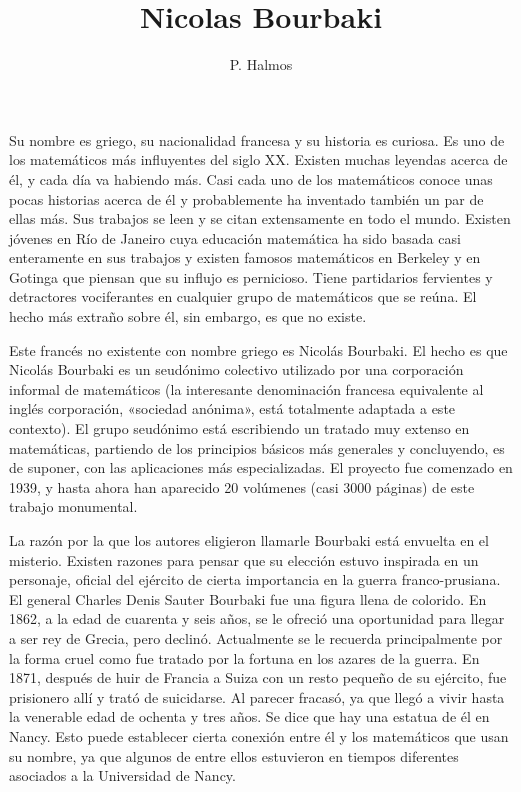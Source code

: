 \documentclass[a4paper, 12pt]{article}
\title{Nicolas Bourbaki}
\author{P. Halmos}
\date{}
\begin{document}
\begin{tcolorbox}[colback=blue!5!white,colframe=blue!75!black]

\vspace{-1.8cm}
\textbf \maketitle

\end{tcolorbox}

\bigskip



Su nombre es griego, su nacionalidad francesa y su historia es curiosa. 
Es uno de los matemáticos más influyentes del siglo XX. Existen 
muchas leyendas acerca de él, y cada día va habiendo más. Casi 
cada uno de los matemáticos conoce unas pocas historias acerca de 
él y probablemente ha inventado también un par de ellas más. Sus 
trabajos se leen y se citan extensamente en todo el mundo. Existen 
jóvenes en Río de Janeiro cuya educación matemática ha sido 
basada casi enteramente en sus trabajos y existen famosos matemáticos en 
Berkeley y en Gotinga que piensan que su influjo es pernicioso. Tiene 
partidarios fervientes y detractores vociferantes en cualquier grupo de 
matemáticos que se reúna. El hecho más extraño sobre él, 
sin embargo, es que no existe. 

Este francés no existente con nombre griego es Nicolás 
Bourbaki. El hecho es que Nicolás Bourbaki es un seudónimo colectivo 
utilizado por una corporación informal de matemáticos (la 
interesante denominación francesa equivalente al inglés 
corporación, «sociedad anónima», está totalmente adaptada a este 
contexto). El grupo seudónimo está escribiendo un tratado muy 
extenso en matemáticas, partiendo de los principios básicos más 
generales y concluyendo, es de suponer, con las aplicaciones más 
especializadas. El proyecto fue comenzado en 1939, y hasta ahora han 
aparecido 20 volúmenes (casi 3000 páginas) de este trabajo 
monumental. 

La razón por la que los autores eligieron llamarle Bourbaki 
está envuelta en el misterio. Existen razones para pensar que su 
elección estuvo inspirada en un personaje, oficial del ejército de 
cierta importancia en la guerra franco-prusiana. El general Charles Denis 
Sauter Bourbaki fue una figura llena de colorido. En 1862, a la edad de 
cuarenta y seis años, se le ofreció una oportunidad para llegar a 
ser rey de Grecia, pero declinó. Actualmente se le recuerda 
principalmente por la forma cruel como fue tratado por la fortuna en los 
azares de la guerra. En 1871, después de huir de Francia a Suiza con un 
resto pequeño de su ejército, fue prisionero allí y trató 
de suicidarse. Al parecer fracasó, ya que llegó a vivir hasta la 
venerable edad de ochenta y tres años. Se dice que hay una estatua de 
él en Nancy. Esto puede establecer cierta conexión entre él y 
los matemáticos que usan su nombre, ya que algunos de entre ellos 
estuvieron en tiempos diferentes asociados a la Universidad de Nancy. 
\end{document}
